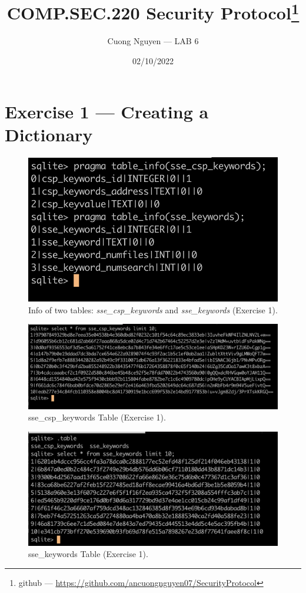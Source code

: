 \documentclass{article}
\title{COMP.SEC.220 Security Protocol\footnote{github --- \url{https://github.com/ancuongnguyen07/SecurityProtocol}}}
\author{Cuong Nguyen --- LAB 6}
\date{02/10/2022}
\begin{document}
    
\maketitle

\section*{Exercise 1 --- Creating a Dictionary}

\begin{figure}[hpt]
    \centering
    \includegraphics[height=\textheight,width=\textwidth,
                    keepaspectratio]{tables_info.png}
    \caption{Info of two tables: \emph{sse\_csp\_keywords} and
    \emph{sse\_keywords} (Exercise 1).}
\end{figure}

\begin{figure}[hpt]
    \centering
    \includegraphics[height=\textheight,width=\textwidth,
    keepaspectratio]{sse_csp_keywords_table.png}
    \caption{sse\_csp\_keywords Table (Exercise 1).}\label{fig:sse_csp_keywords}
\end{figure}

\begin{figure}[hpt]
    \centering
    \includegraphics[height=\textheight,width=\textwidth,
    keepaspectratio]{sse_keywords_table.png}
    \caption{sse\_keywords Table (Exercise 1).}\label{fig:sse_keywords}
\end{figure}
\end{document}
